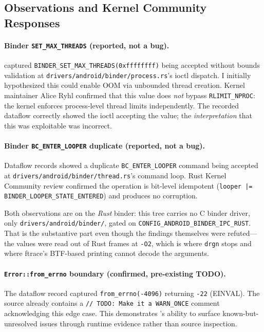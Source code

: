 \documentclass{article}
\begin{document}
\subsection{Observations and Kernel Community Responses}

\paragraph{Binder \texttt{SET\_MAX\_THREADS} (reported, not a bug).}
\toolname{} captured \texttt{BINDER\_SET\_MAX\_THREADS(0xffffffff)} being
accepted without bounds validation at
\texttt{drivers/android/binder/process.rs}'s ioctl dispatch. I initially
hypothesized this could
enable OOM via unbounded thread creation. Kernel maintainer Alice Ryhl
confirmed that this value does \emph{not} bypass \texttt{RLIMIT\_NPROC}:
the kernel enforces process-level thread limits independently. The recorded
dataflow correctly showed the ioctl accepting the value; the \emph{interpretation}
that this was exploitable was incorrect.

\paragraph{Binder \texttt{BC\_ENTER\_LOOPER} duplicate (reported, not a bug).}
Dataflow records showed a duplicate \texttt{BC\_ENTER\_LOOPER} command being
accepted at \texttt{drivers/android/binder/thread.rs}'s command loop. Rust
Kernel Community review confirmed the operation is bit-level idempotent
(\texttt{looper |= BINDER\_LOOPER\_STATE\_ENTERED}) and produces no corruption.

\noindent Both observations are on the \emph{Rust} binder: this tree carries no
C binder driver, only
\texttt{drivers/android/binder/}, gated on
\texttt{CONFIG\_ANDROID\_BINDER\_IPC\_RUST}. That is the substantive part
even though the findings themselves were refuted---the values were read out of
Rust frames at \texttt{-O2}, which is where \texttt{drgn} stops and where
ftrace's BTF-based printing cannot decode the arguments.

\paragraph{\texttt{Error::from\_errno} boundary (confirmed, pre-existing TODO).}
The dataflow record captured \texttt{from\_errno(-4096)} returning \texttt{-22}
(EINVAL). The source already contains a \texttt{// TODO: Make it a WARN\_ONCE}
comment acknowledging this edge case. This demonstrates \toolname{}'s ability
to surface known-but-unresolved issues through runtime evidence rather than
source inspection.
\end{document}
